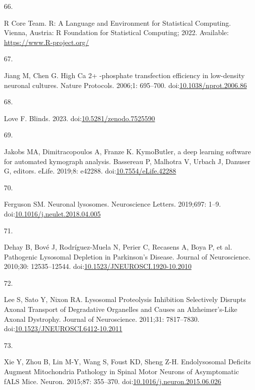 \documentclass[
  12pt,
  a4paper,
]{book}
\newlength{\cslhangindent}
\newlength{\csllabelwidth}
\newlength{\cslentryspacingunit} %
\newenvironment{CSLReferences}[2] %
 {%
  \setlength{\parindent}{0pt}
  \ifodd #1
  \let\oldpar\par
  \def\par{\hangindent=\cslhangindent\oldpar}
  \fi
  \setlength{\parskip}{#2\cslentryspacingunit}
 }%
 {}
\newcommand{\CSLLeftMargin}[1]{\parbox[t]{\csllabelwidth}{#1}}
\newcommand{\CSLRightInline}[1]{\parbox[t]{\linewidth - \csllabelwidth}{#1}\break}
\begin{document}
\begin{CSLReferences}{0}{0}
\leavevmode{}%
\CSLLeftMargin{66. }%
\CSLRightInline{R Core Team. R: {A Language} and {Environment} for {Statistical Computing}. {Vienna, Austria}: {R Foundation for Statistical Computing}; 2022. Available: \url{https://www.R-project.org/}}

\leavevmode{}%
\CSLLeftMargin{67. }%
\CSLRightInline{Jiang M, Chen G. High {Ca} 2+ -phosphate transfection efficiency in low-density neuronal cultures. Nature Protocols. 2006;1: 695--700. doi:\href{https://doi.org/10.1038/nprot.2006.86}{10.1038/nprot.2006.86}}

\leavevmode{}%
\CSLLeftMargin{68. }%
\CSLRightInline{Love F. Blinds. 2023. doi:\href{https://doi.org/10.5281/zenodo.7525590}{10.5281/zenodo.7525590}}

\leavevmode{}%
\CSLLeftMargin{69. }%
\CSLRightInline{Jakobs MA, Dimitracopoulos A, Franze K. {KymoButler}, a deep learning software for automated kymograph analysis. Bassereau P, Malhotra V, Urbach J, Danuser G, editors. eLife. 2019;8: e42288. doi:\href{https://doi.org/10.7554/eLife.42288}{10.7554/eLife.42288}}

\leavevmode{}%
\CSLLeftMargin{70. }%
\CSLRightInline{Ferguson SM. Neuronal lysosomes. Neuroscience Letters. 2019;697: 1--9. doi:\href{https://doi.org/10.1016/j.neulet.2018.04.005}{10.1016/j.neulet.2018.04.005}}

\leavevmode{}%
\CSLLeftMargin{71. }%
\CSLRightInline{Dehay B, Bové J, Rodríguez-Muela N, Perier C, Recasens A, Boya P, et al. Pathogenic {Lysosomal Depletion} in {Parkinson}'s {Disease}. Journal of Neuroscience. 2010;30: 12535--12544. doi:\href{https://doi.org/10.1523/JNEUROSCI.1920-10.2010}{10.1523/JNEUROSCI.1920-10.2010}}

\leavevmode{}%
\CSLLeftMargin{72. }%
\CSLRightInline{Lee S, Sato Y, Nixon RA. Lysosomal {Proteolysis Inhibition Selectively Disrupts Axonal Transport} of {Degradative Organelles} and {Causes} an {Alzheimer}'s-{Like Axonal Dystrophy}. Journal of Neuroscience. 2011;31: 7817--7830. doi:\href{https://doi.org/10.1523/JNEUROSCI.6412-10.2011}{10.1523/JNEUROSCI.6412-10.2011}}

\leavevmode{}%
\CSLLeftMargin{73. }%
\CSLRightInline{Xie Y, Zhou B, Lin M-Y, Wang S, Foust KD, Sheng Z-H. Endolysosomal {Deficits Augment Mitochondria Pathology} in {Spinal Motor Neurons} of {Asymptomatic fALS Mice}. Neuron. 2015;87: 355--370. doi:\href{https://doi.org/10.1016/j.neuron.2015.06.026}{10.1016/j.neuron.2015.06.026}}


\end{CSLReferences}
\end{document}

